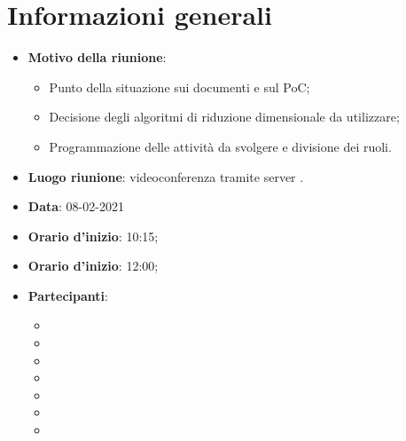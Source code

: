 \section{Informazioni generali}
\begin{itemize}
\item \textbf{Motivo della riunione}: 
\begin{itemize}
\item Punto della situazione sui documenti e sul PoC;
\item Decisione degli algoritmi di riduzione dimensionale da utilizzare;
\item Programmazione delle attività da svolgere e divisione dei ruoli.
\end{itemize}
\item \textbf{Luogo riunione}: videoconferenza tramite server .
\item \textbf{Data}: 08-02-2021
\item \textbf{Orario d'inizio}: 10:15;
\item \textbf{Orario d'inizio}: 12:00;
\item \textbf{Partecipanti}:
	\begin{itemize}
	\item \BM{}
	\item \SG{}
	\item \SP{}
	\item \SH{}
	\item \PA{}
	\item \ZM{}
	\item \RA{}
	\end{itemize}
\end{itemize}

\newpage
